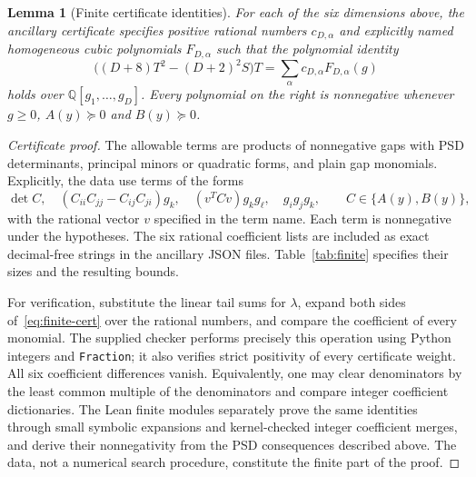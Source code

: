 \documentclass[11pt]{article}
\newtheorem{lemma}[theorem]{Lemma}
\theoremstyle{remark}\newtheorem{remark}[theorem]{Remark}
\newcommand{\Q}{\mathbb Q}
\begin{document}
\begin{lemma}[Finite certificate identities]\label{lem:finite}
For each of the six dimensions above, the ancillary certificate specifies positive rational numbers $c_{D,\alpha}$ and explicitly named homogeneous cubic polynomials $F_{D,\alpha}$ such that the polynomial identity
\begin{equation}\label{eq:finite-cert}
 \bigl((D+8)T^2-(D+2)^2S\bigr)T
 =\sum_{\alpha}c_{D,\alpha}F_{D,\alpha}(g)
\end{equation}
holds over $\Q[g_1,\ldots,g_D]$. Every polynomial on the right is nonnegative whenever $g\geq0$, $A(y)\succeq0$ and $B(y)\succeq0$.
\end{lemma}
\begin{proof}[Certificate proof]
The allowable terms are products of nonnegative gaps with PSD determinants, principal minors or quadratic forms, and plain gap monomials. Explicitly, the data use terms of the forms
\begin{equation}\label{eq:finite-generators}
 \det C,\quad
 (C_{ii}C_{jj}-C_{ij}C_{ji})g_k,\quad
 (v^TCv)g_kg_\ell,\quad g_ig_jg_k,
 \qquad C\in\{A(y),B(y)\},
\end{equation}
with the rational vector $v$ specified in the term name. Each term is nonnegative under the hypotheses. The six rational coefficient lists are included as exact decimal-free strings in the ancillary JSON files. Table~\ref{tab:finite} specifies their sizes and the resulting bounds.

For verification, substitute the linear tail sums for $\lambda$, expand both sides of~\eqref{eq:finite-cert} over the rational numbers, and compare the coefficient of every monomial. The supplied checker performs precisely this operation using Python integers and \texttt{Fraction}; it also verifies strict positivity of every certificate weight. All six coefficient differences vanish. Equivalently, one may clear denominators by the least common multiple of the denominators and compare integer coefficient dictionaries. The Lean finite modules separately prove the same identities through small symbolic expansions and kernel-checked integer coefficient merges, and derive their nonnegativity from the PSD consequences described above. The data, not a numerical search procedure, constitute the finite part of the proof.
\end{proof}
\end{document}
